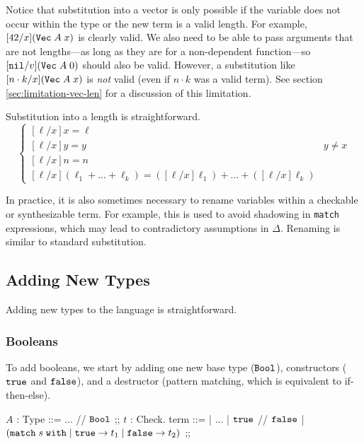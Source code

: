 \documentclass[acmsmall,nonacm]{acmart}
\begin{document}
Notice that substitution into a vector is only possible if the variable does not occur within the type or the new term is a valid length.
For example, $[42 / x] (\texttt{Vec} \; A \; x)$ is clearly valid.
We also need to be able to pass arguments that are not lengths---as long as they are for a non-dependent function---so $[\texttt{nil} / v] (\texttt{Vec} \; A \; 0)$ should also be valid.
However, a substitution like $[n \cdot k / x] (\texttt{Vec} \; A \; x)$ is \emph{not} valid (even if $n \cdot k$ was a valid term).
See section \ref{sec:limitation-vec-len} for a discussion of this limitation.

Substitution into a length is straightforward.
\begin{equation*}
    \begin{cases}
        [\ell / x] x = \ell \\
        [\ell / x] y = y & y \neq x \\
        [\ell / x] n = n \\
        [\ell / x] (\ell_1 + ... + \ell_k) = ([\ell / x] \ell_1) + ... + ([\ell / x] \ell_k)
    \end{cases}
\end{equation*}

In practice, it is also sometimes necessary to rename variables within a checkable or synthesizable term.
For example, this is used to avoid shadowing in \texttt{match} expressions, which may lead to contradictory assumptions in $\Delta$.
Renaming is similar to standard substitution.

\subsection{Adding New Types}
\label{sec:more-types}

Adding new types to the language is straightforward.

\subsubsection{Booleans}

To add booleans, we start by adding one new base type ($\texttt{Bool}$), constructors ($\texttt{true}$ and $\texttt{false}$), and a destructor (pattern matching, which is equivalent to if-then-else).

\begin{center}
\begin{bnf}
    $A$ : Type ::= ... // $\texttt{Bool}$
        ;;
    $t$ : Check. term ::=
        | ...
        | $\texttt{true}$ // $\texttt{false}$
        | $\left( \texttt{match} \; s \; \texttt{with} \; | \; \texttt{true} \rightarrow t_1 \; | \; \texttt{false} \rightarrow t_2 \right)$
        ;;
\end{bnf}
\end{center}
\end{document}
